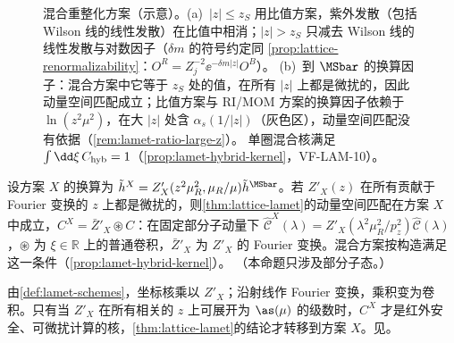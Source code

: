 \begin{figure}[htbp]
\caption{混合重整化方案（示意）。(a)~$|z|\le z_S$ 用比值方案，紫外发散（包括 Wilson 线的线性发散）在比值中相消；$|z|>z_S$ 只减去 Wilson 线的线性发散与对数因子（$\delta m$ 的符号约定同 \cref{prop:lattice-renormalizability}：$O^R=Z_j^{-2}\ee^{-\delta m|z|}O^B$）。
(b)~到 $\MSbar$ 的换算因子：混合方案中它等于 $z_S$ 处的值，在所有 $|z|$ 上都是微扰的，因此动量空间匹配成立；比值方案与 RI/MOM 方案的换算因子依赖于 $\ln(z^2\mu^2)$，在大 $|z|$ 处含 $\alpha_s(1/|z|)$（灰色区），动量空间匹配没有依据（\cref{rem:lamet-ratio-large-z}）。
单圈混合核满足 $\int\dd\xi\,C_{\rm hyb}=1$（\cref{prop:lamet-hybrid-kernel}，VF-LAM-10）。}
\label{fig:lamet-hybrid}
\end{figure}
\begin{proposition}\label{prop:lamet-scheme-validity}
设方案 $X$ 的换算为 $\tilde h^X=Z'_X(z^2\mu_R^2,\mu_R/\mu)\tilde h^{\MSbar}$。若 $Z'_X(z)$ 在所有贡献于 Fourier 变换的 $z$ 上都是微扰的，则\cref{thm:lattice-lamet}的动量空间匹配在方案 $X$ 中成立，$C^X=\bar Z'_X\circledast C$：在固定部分子动量下 $\hat{\mathcal C}^X(\lambda)=Z'_X(\lambda^2\mu_R^2/p_z^2)\hat{\mathcal C}(\lambda)$，$\circledast$ 为 $\xi\in\mathbb R$ 上的普通卷积，$\bar Z'_X$ 为 $Z'_X$ 的 Fourier 变换。混合方案按构造满足这一条件（\cref{prop:lamet-hybrid-kernel}）。
（本命题只涉及部分子态。）
\end{proposition}

\begin{proofsketch}
由\cref{def:lamet-schemes}，坐标核乘以 $Z'_X$；沿射线作 Fourier 变换，乘积变为卷积。只有当 $Z'_X$ 在所有相关的 $z$ 上可展开为 $\as(\mu)$ 的级数时，$C^X$ 才是红外安全、可微扰计算的核，\cref{thm:lattice-lamet}的结论才转移到方案 $X$。见\cite{JiEtAl2021,Ji:2020brr}。
\end{proofsketch}


